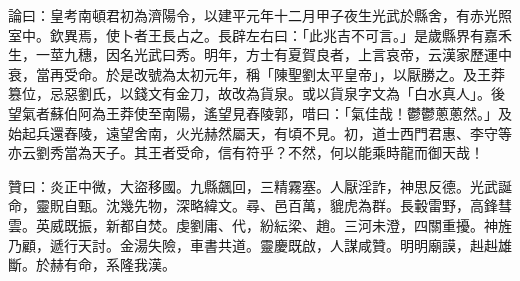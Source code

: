 \begin{pinyinscope}
論曰：皇考南頓君初為濟陽令，以建平元年十二月甲子夜生光武於縣舍，有赤光照室中。欽異焉，使卜者王長占之。長辟左右曰：「此兆吉不可言。」是歲縣界有嘉禾生，一莖九穗，因名光武曰秀。明年，方士有夏賀良者，上言哀帝，云漢家歷運中衰，當再受命。於是改號為太初元年，稱「陳聖劉太平皇帝」，以厭勝之。及王莽篡位，忌惡劉氏，以錢文有金刀，故改為貨泉。或以貨泉字文為「白水真人」。後望氣者蘇伯阿為王莽使至南陽，遙望見舂陵郭，唶曰：「氣佳哉！鬱鬱蔥蔥然。」及始起兵還舂陵，遠望舍南，火光赫然屬天，有頃不見。初，道士西門君惠、李守等亦云劉秀當為天子。其王者受命，信有符乎？不然，何以能乘時龍而御天哉！

贊曰：炎正中微，大盜移國。九縣飆回，三精霧塞。人厭淫詐，神思反德。光武誕命，靈貺自甄。沈幾先物，深略緯文。尋、邑百萬，貔虎為群。長轂雷野，高鋒彗雲。英威既振，新都自焚。虔劉庸、代，紛紜梁、趙。三河未澄，四關重擾。神旌乃顧，遞行天討。金湯失險，車書共道。靈慶既啟，人謀咸贊。明明廟謨，赳赳雄斷。於赫有命，系隆我漢。


\end{pinyinscope}